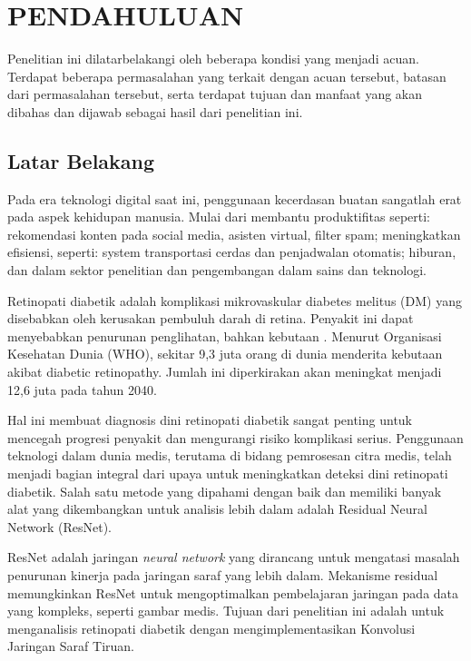 \chapter{PENDAHULUAN}
\label{chap:pendahuluan}


Penelitian ini dilatarbelakangi oleh beberapa kondisi yang menjadi acuan. Terdapat beberapa permasalahan yang terkait dengan acuan tersebut, batasan dari permasalahan tersebut, serta terdapat tujuan dan manfaat yang akan dibahas dan dijawab sebagai hasil dari penelitian ini.

\section{Latar Belakang}
\label{sec:latarbelakang}

Pada era teknologi digital saat ini, penggunaan kecerdasan buatan sangatlah erat pada aspek kehidupan manusia. Mulai dari membantu produktifitas seperti: rekomendasi konten pada social media, asisten virtual, filter spam; meningkatkan efisiensi, seperti: system transportasi cerdas dan penjadwalan otomatis; hiburan, dan dalam sektor penelitian dan pengembangan dalam sains dan teknologi.

Retinopati diabetik adalah komplikasi mikrovaskular diabetes melitus (DM) yang disebabkan oleh kerusakan pembuluh darah di retina. Penyakit ini dapat menyebabkan penurunan penglihatan, bahkan kebutaan \parencite{Yusran2022}. Menurut Organisasi Kesehatan Dunia (WHO), sekitar 9,3 juta orang di dunia menderita kebutaan akibat diabetic retinopathy. Jumlah ini diperkirakan akan meningkat menjadi 12,6 juta pada tahun 2040.

Hal ini membuat diagnosis dini retinopati diabetik sangat penting untuk mencegah progresi penyakit dan mengurangi risiko komplikasi serius. Penggunaan teknologi dalam dunia medis, terutama di bidang pemrosesan citra medis, telah menjadi bagian integral dari upaya untuk meningkatkan deteksi dini retinopati diabetik. Salah satu metode yang dipahami dengan baik dan memiliki banyak alat yang dikembangkan untuk analisis lebih dalam adalah Residual Neural Network (ResNet).

ResNet adalah jaringan \emph{neural network} yang dirancang untuk mengatasi masalah penurunan kinerja pada jaringan saraf yang lebih dalam. Mekanisme residual memungkinkan ResNet untuk mengoptimalkan pembelajaran jaringan pada data yang kompleks, seperti gambar medis. Tujuan dari penelitian ini adalah untuk menganalisis retinopati diabetik dengan mengimplementasikan Konvolusi Jaringan Saraf Tiruan.

